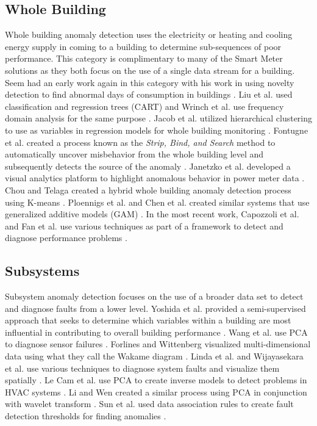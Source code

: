 \documentclass[preprint,12pt,3p]{elsarticle}
\begin{document}
\subsection{Whole Building}
Whole building anomaly detection uses the electricity or heating and cooling energy supply in coming to a building to determine sub-sequences of poor performance. This category is complimentary to many of the Smart Meter solutions as they both focus on the use of a single data stream for a building. Seem had an early work again in this category with his work in using novelty detection to find abnormal days of consumption in buildings \cite{seem_using_2006}. Liu et al. used classification and regression trees (CART) \cite{liu_method_2010} and Wrinch et al. use frequency domain analysis for the same purpose \cite{wrinch_anomaly_2012}. Jacob et al. utilized hierarchical clustering to use as variables in regression models for whole building monitoring \cite{jacob_black-box_2010}. Fontugne et al. created a process known as the \emph{Strip, Bind, and Search} method to automatically uncover misbehavior from the whole building level and subsequently detects the source of the anomaly \cite{fontugne_strip_2013}. Janetzko et al. developed a visual analytics platform to highlight anomalous behavior in power meter data \cite{janetzko_anomaly_2013}. Chou and Telaga created a hybrid whole building anomaly detection process using K-means \cite{chou_real-time_2014}. Ploennigs et al. and Chen et al. created similar systems that use generalized additive models (GAM) \cite{ploennigs_exploiting_2013,chen_statistical_2014}. In the most recent work, Capozzoli et al. and Fan et al. use various techniques as part of a framework to detect and diagnose performance problems \cite{capozzoli_fault_2015,fan_framework_2015}. 

\subsection{Subsystems}
Subsystem anomaly detection focuses on the use of a broader data set to detect and diagnose faults from a lower level. Yoshida et al. provided a semi-supervised approach that seeks to determine which variables within a building are most influential in contributing to overall building performance  \cite{yoshida_identification_2008}. Wang et al. use PCA to diagnose sensor failures \cite{wang_system-level_2010}. Forlines and Wittenberg visualized multi-dimensional data using what they call the Wakame diagram \cite{forlines_wakame:_2010}. Linda et al. and Wijayasekara et al. use various techniques to diagnose system faults and visualize them spatially \cite{linda_computational_2012,wijayasekara_mining_2014}. Le Cam et al. use PCA to create inverse models to detect problems in HVAC systems \cite{le_cam_application_2014}. Li and Wen created a similar process using PCA in conjunction with wavelet transform \cite{li_model-based_2014}. Sun et al. used data association rules to create fault detection thresholds for finding anomalies \cite{sun_efficient_2015}.
\end{document}
